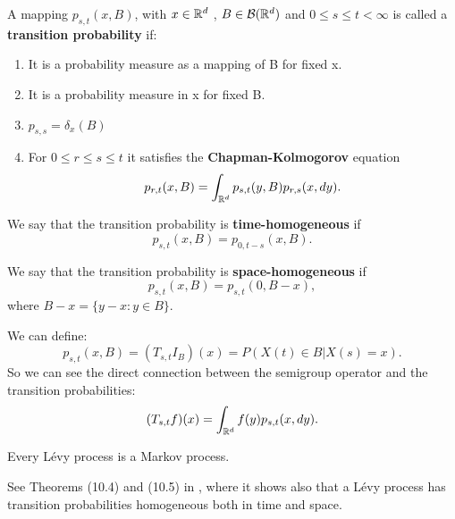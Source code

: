\begin{Definition}\label{trans_prob}
 A mapping $p_{s,t}(x,B)$, with $x\in \mathbb{R}^d$ , $B\in \mathcal{B}(\mathbb{R}^d)$ and $0\leq s \leq t < \infty$
 is called a \textbf{transition probability} if: 
 \begin{enumerate}
  \item It is a probability measure as a mapping of B for fixed x.
  \item It is a probability measure in x for fixed B.
  \item $p_{s,s} = \delta_x(B)$
  \item For $0\leq r \leq s \leq t$ it satisfies the \textbf{Chapman-Kolmogorov} equation
  \begin{equation}
   p_{r,t}(x,B) = \int_{\mathbb{R}^d} p_{s,t}(y,B)p_{r,s}(x,dy). 
  \end{equation}  
 \end{enumerate}
\end{Definition}

\begin{Definition}
We say that the transition probability is \textbf{time-homogeneous} if 
\begin{equation}
 p_{s,t}(x,B) = p_{0,t-s}(x,B).
\end{equation}
\end{Definition}

\begin{Definition}
We say that the transition probability is \textbf{space-homogeneous} if 
\begin{equation}
 p_{s,t}(x,B) = p_{s,t}(0,B-x),
\end{equation}
where $B-x = \{y-x : y\in B \}$.
\end{Definition}
\vspace{1.5em}
We can define:
\begin{equation}
 p_{s,t}(x,B) = (T_{s,t} I_B)(x) = P(X(t) \in B | X(s)=x).
\end{equation}
So we can see the direct connection between the semigroup operator and the transition probabilities:
\begin{equation}\label{evolution}
 (T_{s,t}f)(x) = \int_{\mathbb{R}^d} f(y) p_{s,t}(x,dy). 
\end{equation}



\begin{Theorem}
Every Lévy process is a Markov process.
\end{Theorem}
 See Theorems (10.4) and (10.5) in \cite{Sato}, where it shows also that a Lévy process has transition probabilities 
 homogeneous both in time and space.


